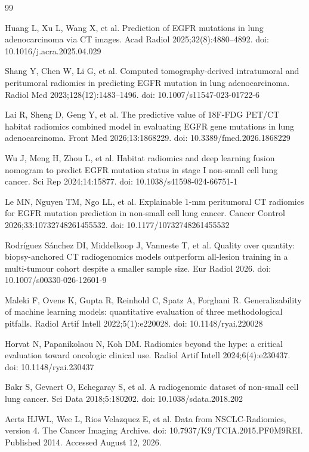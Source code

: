 \documentclass[11pt]{article}
\begin{document}
\begin{thebibliography}{99}
\setlength{\itemsep}{0.4em}

Huang L, Xu L, Wang X, et al. Prediction of EGFR mutations in lung
adenocarcinoma via CT images. Acad Radiol 2025;32(8):4880--4892.
doi: 10.1016/j.acra.2025.04.029

Shang Y, Chen W, Li G, et al. Computed tomography-derived intratumoral and
peritumoral radiomics in predicting EGFR mutation in lung adenocarcinoma. Radiol
Med 2023;128(12):1483--1496. doi: 10.1007/s11547-023-01722-6

Lai R, Sheng D, Geng Y, et al. The predictive value of 18F-FDG PET/CT habitat
radiomics combined model in evaluating EGFR gene mutations in lung
adenocarcinoma. Front Med 2026;13:1868229. doi: 10.3389/fmed.2026.1868229

Wu J, Meng H, Zhou L, et al. Habitat radiomics and deep learning fusion nomogram
to predict EGFR mutation status in stage I non-small cell lung cancer. Sci Rep
2024;14:15877. doi: 10.1038/s41598-024-66751-1

Le MN, Nguyen TM, Ngo LL, et al. Explainable 1-mm peritumoral CT radiomics for
EGFR mutation prediction in non-small cell lung cancer. Cancer Control
2026;33:10732748261455532. doi: 10.1177/10732748261455532

Rodríguez Sánchez DI, Middelkoop J, Vanneste T, et al. Quality over quantity:
biopsy-anchored CT radiogenomics models outperform all-lesion training in a
multi-tumour cohort despite a smaller sample size. Eur Radiol 2026.
doi: 10.1007/s00330-026-12601-9

Maleki F, Ovens K, Gupta R, Reinhold C, Spatz A, Forghani R. Generalizability of
machine learning models: quantitative evaluation of three methodological
pitfalls. Radiol Artif Intell 2022;5(1):e220028. doi: 10.1148/ryai.220028

Horvat N, Papanikolaou N, Koh DM. Radiomics beyond the hype: a critical
evaluation toward oncologic clinical use. Radiol Artif Intell 2024;6(4):e230437.
doi: 10.1148/ryai.230437

Bakr S, Gevaert O, Echegaray S, et al. A radiogenomic dataset of non-small cell
lung cancer. Sci Data 2018;5:180202. doi: 10.1038/sdata.2018.202

Aerts HJWL, Wee L, Rios Velazquez E, et al. Data from NSCLC-Radiomics, version 4.
The Cancer Imaging Archive. doi: 10.7937/K9/TCIA.2015.PF0M9REI. Published 2014.
Accessed August 12, 2026.


\end{thebibliography}
\end{document}
